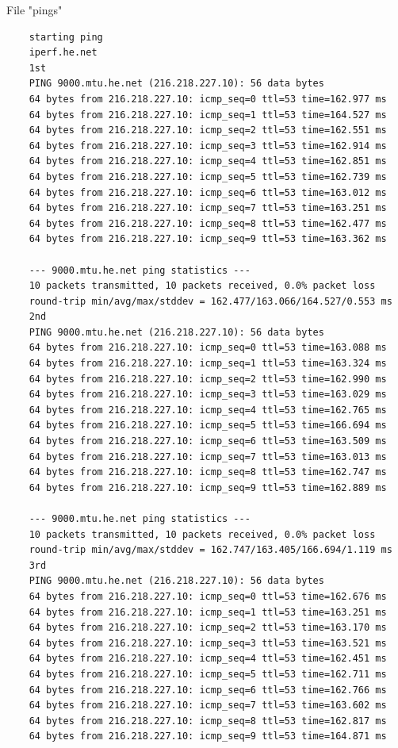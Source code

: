 \documentclass[paper=a4, fontsize=10pt]{scrartcl} %
\numberwithin{equation}{section} %
\numberwithin{figure}{section} %
\numberwithin{table}{section} %
\begin{document}
File "pings"
\begin{lstlisting}
    starting ping
    iperf.he.net
    1st
    PING 9000.mtu.he.net (216.218.227.10): 56 data bytes
    64 bytes from 216.218.227.10: icmp_seq=0 ttl=53 time=162.977 ms
    64 bytes from 216.218.227.10: icmp_seq=1 ttl=53 time=164.527 ms
    64 bytes from 216.218.227.10: icmp_seq=2 ttl=53 time=162.551 ms
    64 bytes from 216.218.227.10: icmp_seq=3 ttl=53 time=162.914 ms
    64 bytes from 216.218.227.10: icmp_seq=4 ttl=53 time=162.851 ms
    64 bytes from 216.218.227.10: icmp_seq=5 ttl=53 time=162.739 ms
    64 bytes from 216.218.227.10: icmp_seq=6 ttl=53 time=163.012 ms
    64 bytes from 216.218.227.10: icmp_seq=7 ttl=53 time=163.251 ms
    64 bytes from 216.218.227.10: icmp_seq=8 ttl=53 time=162.477 ms
    64 bytes from 216.218.227.10: icmp_seq=9 ttl=53 time=163.362 ms
    
    --- 9000.mtu.he.net ping statistics ---
    10 packets transmitted, 10 packets received, 0.0% packet loss
    round-trip min/avg/max/stddev = 162.477/163.066/164.527/0.553 ms
    2nd
    PING 9000.mtu.he.net (216.218.227.10): 56 data bytes
    64 bytes from 216.218.227.10: icmp_seq=0 ttl=53 time=163.088 ms
    64 bytes from 216.218.227.10: icmp_seq=1 ttl=53 time=163.324 ms
    64 bytes from 216.218.227.10: icmp_seq=2 ttl=53 time=162.990 ms
    64 bytes from 216.218.227.10: icmp_seq=3 ttl=53 time=163.029 ms
    64 bytes from 216.218.227.10: icmp_seq=4 ttl=53 time=162.765 ms
    64 bytes from 216.218.227.10: icmp_seq=5 ttl=53 time=166.694 ms
    64 bytes from 216.218.227.10: icmp_seq=6 ttl=53 time=163.509 ms
    64 bytes from 216.218.227.10: icmp_seq=7 ttl=53 time=163.013 ms
    64 bytes from 216.218.227.10: icmp_seq=8 ttl=53 time=162.747 ms
    64 bytes from 216.218.227.10: icmp_seq=9 ttl=53 time=162.889 ms
    
    --- 9000.mtu.he.net ping statistics ---
    10 packets transmitted, 10 packets received, 0.0% packet loss
    round-trip min/avg/max/stddev = 162.747/163.405/166.694/1.119 ms
    3rd
    PING 9000.mtu.he.net (216.218.227.10): 56 data bytes
    64 bytes from 216.218.227.10: icmp_seq=0 ttl=53 time=162.676 ms
    64 bytes from 216.218.227.10: icmp_seq=1 ttl=53 time=163.251 ms
    64 bytes from 216.218.227.10: icmp_seq=2 ttl=53 time=163.170 ms
    64 bytes from 216.218.227.10: icmp_seq=3 ttl=53 time=163.521 ms
    64 bytes from 216.218.227.10: icmp_seq=4 ttl=53 time=162.451 ms
    64 bytes from 216.218.227.10: icmp_seq=5 ttl=53 time=162.711 ms
    64 bytes from 216.218.227.10: icmp_seq=6 ttl=53 time=162.766 ms
    64 bytes from 216.218.227.10: icmp_seq=7 ttl=53 time=163.602 ms
    64 bytes from 216.218.227.10: icmp_seq=8 ttl=53 time=162.817 ms
    64 bytes from 216.218.227.10: icmp_seq=9 ttl=53 time=164.871 ms
    

\end{lstlisting}
\end{document}
